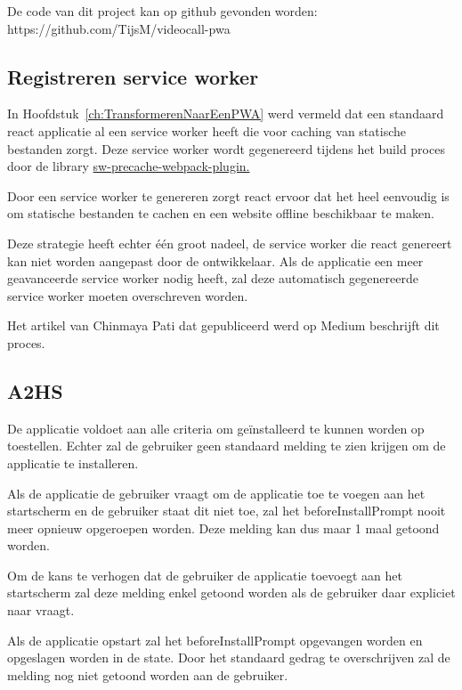 	De code van dit project kan op github gevonden worden: https://github.com/TijsM/videocall-pwa
	
	\subsection{Registreren service worker}
		
		In Hoofdstuk~\ref{ch:TransformerenNaarEenPWA} werd vermeld dat een standaard react applicatie al een service worker heeft die voor caching van statische bestanden zorgt. Deze service worker wordt gegenereerd tijdens het build proces door de library \href{https://github.com/goldhand/sw-precache-webpack-plugin}{sw-precache-webpack-plugin. }  
		\autocite{Mester2019}
		
		Door een service worker te genereren zorgt react ervoor dat het heel eenvoudig is om statische bestanden te cachen en een website offline beschikbaar te maken.
		
		Deze strategie heeft echter één groot nadeel, de service worker die react genereert kan niet worden aangepast door de ontwikkelaar. Als de applicatie een meer geavanceerde service worker nodig heeft, zal deze automatisch gegenereerde service worker moeten overschreven worden.
		
		Het artikel van Chinmaya Pati dat gepubliceerd werd op Medium beschrijft dit proces. \autocite{Pati2019}
		
	\subsection{A2HS}
	
		De applicatie voldoet aan alle criteria om geïnstalleerd te kunnen worden op toestellen. Echter zal de gebruiker geen standaard melding te zien krijgen om de applicatie te installeren.		
		
		Als de applicatie de gebruiker vraagt om de applicatie toe te voegen aan het startscherm en de gebruiker staat dit niet toe, zal het beforeInstallPrompt nooit meer opnieuw opgeroepen worden. Deze melding kan dus maar 1 maal getoond worden.
		
		Om de kans te verhogen dat de gebruiker de applicatie toevoegt aan het startscherm zal deze melding enkel getoond worden als de gebruiker daar expliciet naar vraagt.
		\autocite{Mclachlan2020}
		
		Als de applicatie opstart zal het beforeInstallPrompt opgevangen worden en opgeslagen worden in de state. Door het standaard gedrag te overschrijven zal de melding nog niet getoond worden aan de gebruiker.
		\autocite{LePage2020b}
		
